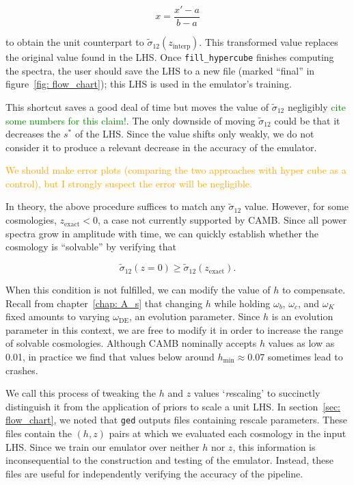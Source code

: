 \begin{equation}
x = \frac{x' - a}{b - a}
\end{equation}

to obtain the unit counterpart to $\tilde{\sigma}_{12}(z_\text{interp})$.
This transformed value replaces the original value found in the LHS.
Once \verb|fill_hypercube| finishes computing the spectra, the user
should save the LHS to a new file (marked ``final'' in
figure~\ref{fig: flow_chart}); this LHS is used in the emulator's training.

This shortcut saves a good deal of time but moves the value of
$\tilde{\sigma}_{12}$ negligibly
\textcolor{green}{cite some numbers for this claim!}.
The only downside of moving $\tilde{\sigma}_{12}$ could be that it
decreases the $s^*$ of the LHS. Since the value shifts only weakly, we do not
consider it to produce a relevant decrease in the accuracy of the emulator.

\textcolor{orange}{We should make error plots (comparing the two approaches 
with hyper cube as a control), but I strongly suspect the error will be 
negligible.}

In theory, the above procedure suffices to match any $\tilde{\sigma}_{12}$
value. However, for some cosmologies, $z_\text{exact} < 0$, a case not
currently supported by CAMB. Since all power spectra grow in amplitude with
time, we can quickly establish whether the cosmology is ``solvable'' by
verifying that

\begin{equation}
\label{eq: solvability_cond}
\tilde{\sigma}_{12}(z = 0) \geq \tilde{\sigma}_{12}(z_\text{exact})
.\end{equation}

When this condition is not fulfilled, we can modify the value of $h$ to
compensate. Recall from chapter~\ref{chap: A_s} that changing $h$ while
holding $\omega_b$, $\omega_c$, and $\omega_K$ fixed amounts to varying
$\omega_\text{DE}$, an evolution parameter. Since $h$ is an evolution
parameter in this context, we are free to modify it in order to increase the
range of solvable cosmologies. Although CAMB nominally accepts $h$ values as
low as 0.01, in practice we find that values below around
$h_\text{min} \approx 0.07$ sometimes lead to crashes.

We call this process of tweaking the $h$ and $z$ values
`\textit{re}scaling' to
succinctly distinguish it from the application of priors to scale a unit LHS.
In section~\ref{sec: flow_chart}, we noted that \texttt{ged} outputs
files containing rescale parameters. These files contain the $(h, z)$ pairs
at which we evaluated each cosmology in the input LHS. Since we train our
emulator over neither $h$ nor $z$, this information is inconsequential to the
construction and testing of the emulator. Instead, these files are useful for
independently verifying the accuracy of the pipeline.

